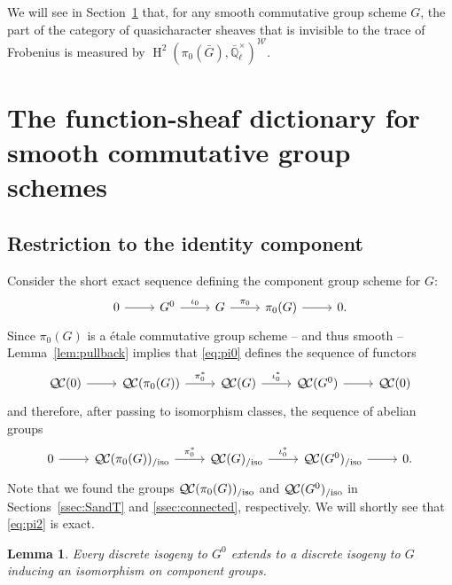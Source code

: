 \documentclass[CM,Submssn,SecEq]{degruyter-crelle} %
\theoremstyle{plain}
\newtheorem{lemma}[theorem]{Lemma}
\theoremstyle{definition}
\theoremstyle{remark}
\newcommand{\EE}{\mathbb{\bar Q}_\ell}
\newcommand{\EEx}{\EE^\times}
\newcommand{\Weil}[1]{\mathcal{W}_{#1}}
\DeclareMathOperator{\Hh}{H}
\newcommand{\QC}{{\mathcal{Q\hskip-0.8pt C}}}
\newcommand{\QCiso}[1]{\QC(#1)_{/\text{iso}}}
\newcommand{\bG}{\bar{G}}
\begin{document}
We will see in Section~\ref{sec:main} that, for any smooth commutative group scheme $G$, the part of the category of quasicharacter sheaves that is invisible to the trace of Frobenius is measured by $\Hh^2(\pi_0(\bG),\EEx)^{\Weil{}}$.

\section{The function-sheaf dictionary for smooth commutative group schemes}\label{sec:main}


\subsection{Restriction to the identity component} \label{ssec:restriction}

Consider the short exact sequence
defining the component group scheme for $G$:
\begin{equation}\label{eq:pi0}
\begin{tikzcd}
0 \rar & G^0 \arrow{r}{\iota_0} & G \arrow{r}{\pi_0} & \pi_0(G) \rar & 0.
\end{tikzcd}
\end{equation}
Since $\pi_0(G)$ is a \'etale commutative group scheme -- and thus smooth --
Lemma~\ref{lem:pullback} implies that \eqref{eq:pi0} defines the sequence of functors
\begin{equation}\label{eq:pi1}
\begin{tikzcd}
\QC(0) \rar & \QC(\pi_0(G)) \arrow{r}{\pi_0^*} & \QC(G) \arrow{r}{\iota_0^*} & \QC(G^0) \rar & \QC(0)
\end{tikzcd}
\end{equation}
and therefore, after passing to isomorphism classes, the sequence of abelian groups
\begin{equation}\label{eq:pi2}
\begin{tikzcd}
0 \rar &
\QCiso{\pi_0(G)} \arrow{r}{\pi_0^*} & \QCiso{G} \arrow{r}{\iota_0^*} & \QCiso{G^0} \rar & 0.
\end{tikzcd}
\end{equation}
 Note that we found the groups $\QCiso{\pi_0(G)}$ and $\QCiso{G^0}$
in Sections~\ref{ssec:SandT} and \ref{ssec:connected}, respectively.
We will shortly see that \eqref{eq:pi2} is exact.


\begin{lemma}\label{lemma:ext}
Every discrete isogeny to $G^0$ extends to a discrete
isogeny to $G$ inducing an isomorphism on component groups.
\end{lemma}
\end{document}
